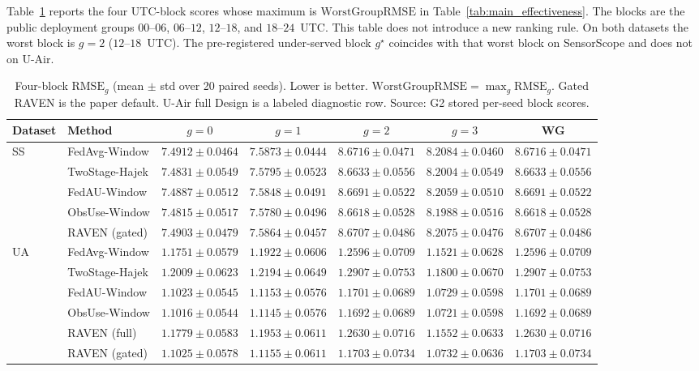 Table~\ref{tab:app_block_rmse} reports the four UTC-block scores whose
maximum is $\mathrm{WorstGroupRMSE}$ in
Table~\ref{tab:main_effectiveness}.  The blocks are the public
deployment groups $00$--$06$, $06$--$12$, $12$--$18$, and $18$--$24$~UTC.
This table does not introduce a new ranking rule.  On both datasets the
worst block is $g=2$ ($12$--$18$~UTC).  The pre-registered under-served
block $g^{\star}$ coincides with that worst block on SensorScope and
does not on U-Air.

\begin{table}[!t]
\centering
\caption{Four-block $\mathrm{RMSE}_g$ (mean $\pm$ std over 20 paired
seeds).  Lower is better.  $\mathrm{WorstGroupRMSE}=\max_g\mathrm{RMSE}_g$.
Gated RAVEN is the paper default.  U-Air full Design is a labeled
diagnostic row.  Source: G2 stored per-seed block scores.}
\label{tab:app_block_rmse}
\scriptsize
\setlength{\tabcolsep}{2.2pt}
\begin{tabular*}{\columnwidth}{@{\extracolsep{\fill}}llccccc}
\toprule
Dataset & Method & $g{=}0$ & $g{=}1$ & $g{=}2$ & $g{=}3$ & WG\\
\midrule
\multirow{5}{*}{SS}
& FedAvg-Window & $7.4912{\pm}0.0464$ & $7.5873{\pm}0.0444$ & $8.6716{\pm}0.0471$ & $8.2084{\pm}0.0460$ & $8.6716{\pm}0.0471$\\
& TwoStage-Hajek & $7.4831{\pm}0.0549$ & $7.5795{\pm}0.0523$ & $8.6633{\pm}0.0556$ & $8.2004{\pm}0.0549$ & $8.6633{\pm}0.0556$\\
& FedAU-Window & $7.4887{\pm}0.0512$ & $7.5848{\pm}0.0491$ & $8.6691{\pm}0.0522$ & $8.2059{\pm}0.0510$ & $8.6691{\pm}0.0522$\\
& ObsUse-Window & $7.4815{\pm}0.0517$ & $7.5780{\pm}0.0496$ & $8.6618{\pm}0.0528$ & $8.1988{\pm}0.0516$ & $8.6618{\pm}0.0528$\\
& RAVEN (gated) & $7.4903{\pm}0.0479$ & $7.5864{\pm}0.0457$ & $8.6707{\pm}0.0486$ & $8.2075{\pm}0.0476$ & $8.6707{\pm}0.0486$\\
\midrule
\multirow{6}{*}{UA}
& FedAvg-Window & $1.1751{\pm}0.0579$ & $1.1922{\pm}0.0606$ & $1.2596{\pm}0.0709$ & $1.1521{\pm}0.0628$ & $1.2596{\pm}0.0709$\\
& TwoStage-Hajek & $1.2009{\pm}0.0623$ & $1.2194{\pm}0.0649$ & $1.2907{\pm}0.0753$ & $1.1800{\pm}0.0670$ & $1.2907{\pm}0.0753$\\
& FedAU-Window & $1.1023{\pm}0.0545$ & $1.1153{\pm}0.0576$ & $1.1701{\pm}0.0689$ & $1.0729{\pm}0.0598$ & $1.1701{\pm}0.0689$\\
& ObsUse-Window & $1.1016{\pm}0.0544$ & $1.1145{\pm}0.0576$ & $1.1692{\pm}0.0689$ & $1.0721{\pm}0.0598$ & $1.1692{\pm}0.0689$\\
& RAVEN (full) & $1.1779{\pm}0.0583$ & $1.1953{\pm}0.0611$ & $1.2630{\pm}0.0716$ & $1.1552{\pm}0.0633$ & $1.2630{\pm}0.0716$\\
& RAVEN (gated) & $1.1025{\pm}0.0578$ & $1.1155{\pm}0.0611$ & $1.1703{\pm}0.0734$ & $1.0732{\pm}0.0636$ & $1.1703{\pm}0.0734$\\
\bottomrule
\end{tabular*}
\end{table}

